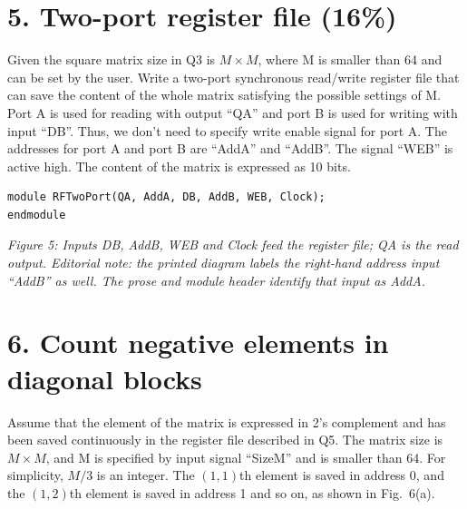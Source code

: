 \documentclass[11pt,a4paper]{article}
\begin{document}
\section*{5. Two-port register file (16\%)}
Given the square matrix size in Q3 is $M\times M$, where M is smaller than 64 and can be set by the user. Write a two-port synchronous read/write register file that can save the content of the whole matrix satisfying the possible settings of M. Port A is used for reading with output ``QA'' and port B is used for writing with input ``DB''. Thus, we don't need to specify write enable signal for port A. The addresses for port A and port B are ``AddA'' and ``AddB''. The signal ``WEB'' is active high. The content of the matrix is expressed as 10 bits.
\par\medskip\noindent\begin{minipage}{\linewidth}
\begin{lstlisting}
module RFTwoPort(QA, AddA, DB, AddB, WEB, Clock);
endmodule
\end{lstlisting}
\end{minipage}\par
\textit{Figure 5: Inputs DB, AddB, WEB and Clock feed the register file; QA is the read output. Editorial note: the printed diagram labels the right-hand address input ``AddB'' as well. The prose and module header identify that input as AddA.}

\section*{6. Count negative elements in diagonal blocks}
Assume that the element of the matrix is expressed in 2's complement and has been saved continuously in the register file described in Q5. The matrix size is $M\times M$, and M is specified by input signal ``SizeM'' and is smaller than 64. For simplicity, $M/3$ is an integer. The $(1,1)$th element is saved in address 0, and the $(1,2)$th element is saved in address 1 and so on, as shown in Fig.~6(a).
\end{document}
